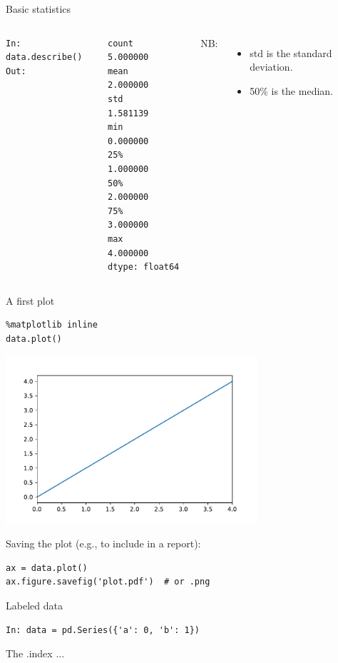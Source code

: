 \documentclass{beamer}
\begin{document}
\begin{frame}[fragile]{Basic statistics}
\begin{columns}
\begin{lstlisting}
In: data.describe()
Out:
\end{lstlisting}
\begin{lstlisting}[style=plain]
count    5.000000
mean     2.000000
std      1.581139
min      0.000000
25%      1.000000
50%      2.000000
75%      3.000000
max      4.000000
dtype: float64
\end{lstlisting}
    NB:
    \begin{itemize}
        \item std is the standard deviation.
        \item 50\% is the median.
    \end{itemize}
\end{columns}
\end{frame}

\begin{frame}[fragile]{A first plot}
\begin{lstlisting}
%matplotlib inline
data.plot()
\end{lstlisting}
\includegraphics[width=0.7\textwidth]{fig/basicplot}
\pause

Saving the plot (e.g., to include in a report):
\begin{lstlisting}
ax = data.plot()
ax.figure.savefig('plot.pdf')  # or .png
\end{lstlisting}
\end{frame}

\begin{frame}[fragile]{Labeled data}
\begin{lstlisting}
In: data = pd.Series({'a': 0, 'b': 1})
\end{lstlisting}
The .index ...
\end{frame}
\end{document}
